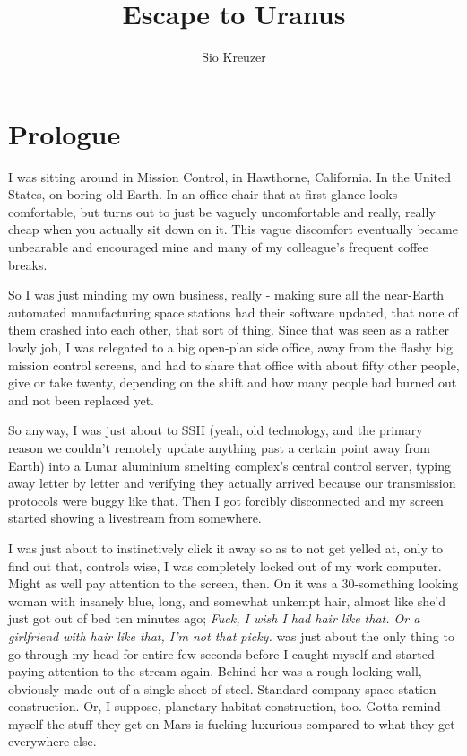 \documentclass[a5paper]{report}%
\author{Sio Kreuzer}
\title{Escape to Uranus}
\begin{document}
\chapter{Prologue}

I was sitting around in Mission Control, in Hawthorne, California.
In the United States, on boring old Earth. In an office chair that at first
glance looks comfortable, but turns out to just be vaguely uncomfortable and
really, really cheap when you actually sit down on it. This vague discomfort
eventually became unbearable and encouraged mine and many of my colleague's
frequent coffee breaks.

So I was just minding my own business, really - making sure all the near-Earth
automated manufacturing space stations had their software updated, that none of
them crashed into each other, that sort of thing. Since that was seen as a
rather lowly job, I was relegated to a big open-plan side office, away from the
flashy big mission control screens, and had to share that office with about
fifty other people, give or take twenty, depending on the shift and how many
people had burned out and not been replaced yet.

So anyway, I was just about to SSH (yeah, old technology, and the primary reason
we couldn't remotely update anything past a certain point away from Earth) into
a Lunar aluminium smelting complex's central control server, typing away letter
by letter and verifying they actually arrived because our transmission protocols
were buggy like that. Then I got forcibly disconnected and my screen started
showing a livestream from somewhere.

I was just about to instinctively click it
away so as to not get yelled at, only to find out that, controls wise, I was
completely locked out of my work computer. Might as well pay attention to the
screen, then. On it was a 30-something looking woman with insanely blue, long,
and somewhat unkempt hair, almost like she'd just got out of bed ten minutes
ago; \textit{Fuck, I wish I had hair like that. Or a girlfriend with hair like
  that, I'm not that picky.} was just about the only thing to go through my head
for entire few seconds before I caught myself and started paying attention to
the stream again. Behind her was a rough-looking wall, obviously made out of a
single sheet of steel. Standard company space station construction. Or, I
suppose, planetary habitat construction, too. Gotta remind myself the stuff they
get on Mars is fucking luxurious compared to what they get everywhere else.
\end{document}
